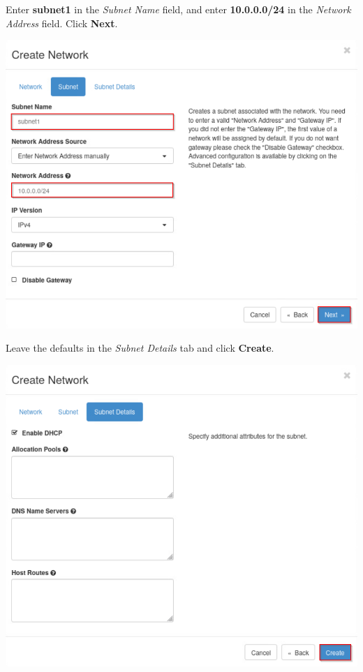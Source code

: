 \documentclass[letterpaper, 12pt]{article}
\begin{document}
\begin{enumerate}
    \begin{labstep}
        Enter \textbf{subnet1} in the \textit{Subnet Name} field, and enter \textbf{10.0.0.0/24} in the \textit{Network Address} field.
        Click \textbf{Next}.

        \begin{center}
            \includegraphics[width=\linewidth]{images/part3/step9.png}
        \end{center}
    \end{labstep}

    \begin{labstep}
        Leave the defaults in the \textit{Subnet Details} tab and click \textbf{Create}.

        \begin{center}
            \includegraphics[width=\linewidth]{images/part3/step10.png}
        \end{center}
    \end{labstep}


\end{enumerate}
\end{document}
